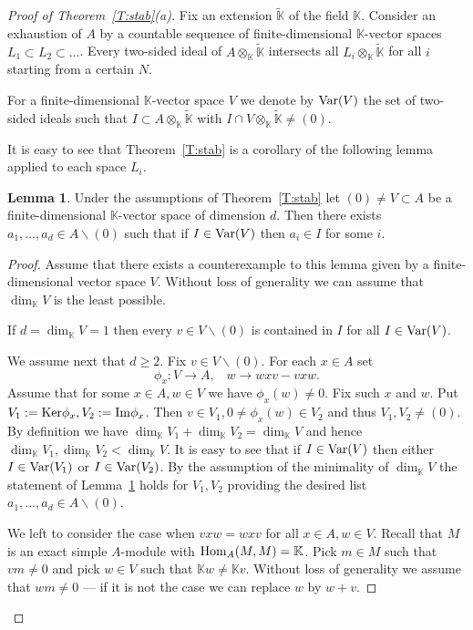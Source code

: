 \documentclass{amsart} \textwidth=18.0cm \oddsidemargin=-1cm \evensidemargin=-1cm \topmargin=-1cm \textheight=23cm
\theoremstyle{definition}
\newtheorem{lemma}{Lemma}
\begin{document}
\begin{proof}[Proof of Theorem~\ref{T:stab}(a)] 
Fix an extension $\widetilde{\mathbb K}$ of the field $\mathbb K$. 
Consider an exhaustion of $A$ by a countable sequence of finite-dimensional $\mathbb K$-vector spaces $L_1\subset L_2\subset\ldots$. 
Every two-sided ideal of $A\otimes_{\mathbb K}\widetilde{\mathbb K}$ intersects all $L_i\otimes_{\mathbb K}\widetilde{\mathbb K}$ for all $i$ starting from a certain $N$.

For a finite-dimensional $\mathbb K$-vector space $V$ we denote by ${\rm Var}(V)$ the set of two-sided ideals such that $I\subset  A\otimes_{\mathbb K}\widetilde{\mathbb K}$ with  $I\cap V\otimes_{\mathbb K}\widetilde{\mathbb K}\ne(0)$.

It is easy to see that Theorem~\ref{T:stab} is a corollary of the following lemma applied to each space $L_i$.
\begin{lemma}\label{L:stab} Under the assumptions of Theorem~\ref{T:stab} let $(0)\ne V\subset A$ be a finite-dimensional $\mathbb K$-vector space of dimension $d$. 
Then there exists $a_1, \ldots, a_d\in A\backslash(0)$ such that if $I\in{\rm Var}(V)$ then $a_i\in I$ for some $i$.\end{lemma}
\begin{proof} 
Assume that there exists a counterexample to this lemma given by a finite-dimensional vector space $V$. 
Without loss of generality we can assume that $\dim_{\mathbb K} V$ is the least possible. 

If $d=\dim_{\mathbb K} V=1$ then every $v\in V\backslash(0)$ is contained in $I$ for all $I\in{\rm Var}(V)$.

We assume next that $d\ge2$. 
Fix $v\in V\backslash(0)$. 
For each $x\in A$ set
$$\phi_x: V\to A, \hspace{10pt} w\to wxv-vxw.$$
Assume that for some $x\in A, w\in V$ we have $\phi_x(w)\ne0$. 
Fix such $x$ and $w$. 
Put $V_1:={\rm Ker}\phi_x, V_2:={\rm Im}\phi_x$. 
Then $v\in V_1, 0\ne\phi_x(w)\in V_2$ and thus $V_1, V_2\ne (0)$. 
By definition we have $\dim_{\mathbb K} V_1+\dim_{\mathbb K} V_2=\dim_{\mathbb K} V$ and hence $\dim_{\mathbb K} V_1, \dim_{\mathbb K} V_2<\dim_{\mathbb K} V$. 
It is easy to see that if $I\in{\rm Var}(V)$ then either $I\in{\rm Var}(V_1)$ or $I\in{\rm Var}(V_2)$. 
By the assumption of the minimality of $\dim_{\mathbb K}V$ the statement of Lemma~\ref{L:stab} holds for $V_1, V_2$ providing the desired list $a_1,\ldots, a_d\in A\backslash(0)$.

We left to consider the case when $vxw=wxv$ for all $x\in A, w\in V$. 
Recall that $M$ is an exact simple $A$-module with ${\rm Hom}_{A}(M, M)=\mathbb K$. 
Pick $m\in M$ such that $vm\ne 0$ and pick $w\in V$ such that  $\mathbb Kw\ne\mathbb Kv$. 
Without loss of generality we assume that $wm\ne0$ --- if it is not the case we can replace $w$ by $w+v$. 


\end{proof}
\end{proof}
\end{document}
